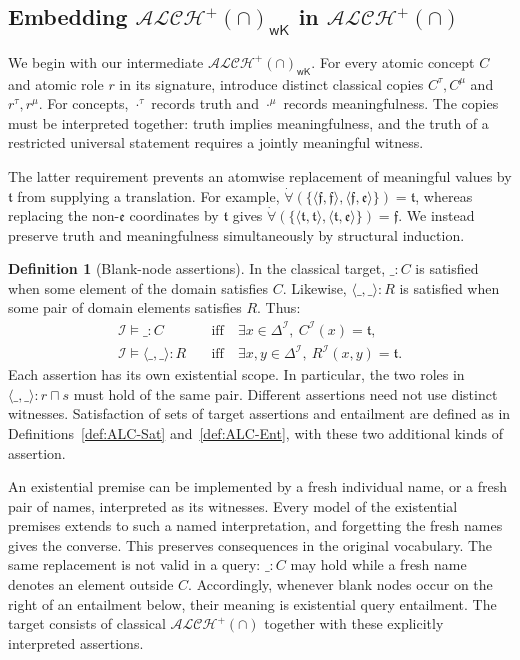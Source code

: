 \documentclass[letterpaper]{article} %
\theoremstyle{definition}
\theoremstyle{definition}
\newtheorem{definition}{Definition}
\theoremstyle{definition}
\theoremstyle{definition}
\theoremstyle{definition}
\newcommand{\vt}{\mathfrak{t}}
\newcommand{\vf}{\mathfrak{f}}
\newcommand{\vu}{\mathfrak{e}}
\begin{document}
\subsection{Embedding $\mathcal{ALCH}^+(\cap)_{\mathsf{wK}}$ in $\mathcal{ALCH}^+(\cap)$}

We begin with our intermediate $\mathcal{ALCH}^+(\cap)_{\mathsf{wK}}$. For every atomic concept $C$ and atomic role $r$ in its signature, introduce distinct classical copies $C^{\tau},C^{\mu}$ and $r^{\tau},r^{\mu}$. For concepts, $\cdot^{\tau}$ records truth and $\cdot^{\mu}$ records meaningfulness. The copies must be interpreted together: truth implies meaningfulness, and the truth of a restricted universal statement requires a jointly meaningful witness.

The latter requirement prevents an atomwise replacement of meaningful values by $\vt$ from supplying a translation. For example, $\dot{\forall}(\{\langle\vf,\vf\rangle,\langle\vf,\vu\rangle\})=\vt$, whereas replacing the non-$\vu$ coordinates by $\vt$ gives $\dot{\forall}(\{\langle\vt,\vt\rangle,\langle\vt,\vu\rangle\})=\vf$. We instead preserve truth and meaningfulness simultaneously by structural induction.

\begin{definition}[Blank-node assertions]\label{def:blank-nodes}
In the classical target, $\_:C$ is satisfied when some element of the domain satisfies $C$. Likewise, $\langle\_,\_\rangle:R$ is satisfied when some pair of domain elements satisfies $R$. Thus:
\begin{align*}
\mathcal{I}\models\_:C
 &\quad\text{iff}\quad \exists x\in\Delta^{\mathcal{I}},\ C^{\mathcal{I}}(x)=\vt,\\
\mathcal{I}\models\langle\_,\_\rangle:R
 &\quad\text{iff}\quad \exists x,y\in\Delta^{\mathcal{I}},\ R^{\mathcal{I}}(x,y)=\vt.
\end{align*}
Each assertion has its own existential scope. In particular, the two roles in $\langle\_,\_\rangle:r\sqcap s$ must hold of the same pair. Different assertions need not use distinct witnesses. Satisfaction of sets of target assertions and entailment are defined as in Definitions~\ref{def:ALC-Sat} and~\ref{def:ALC-Ent}, with these two additional kinds of assertion.
\end{definition}

An existential premise can be implemented by a fresh individual name, or a fresh pair of names, interpreted as its witnesses. Every model of the existential premises extends to such a named interpretation, and forgetting the fresh names gives the converse. This preserves consequences in the original vocabulary. The same replacement is not valid in a query: $\_:C$ may hold while a fresh name denotes an element outside $C$. Accordingly, whenever blank nodes occur on the right of an entailment below, their meaning is existential query entailment. The target consists of classical $\mathcal{ALCH}^{+}(\cap)$ together with these explicitly interpreted assertions.
\end{document}
